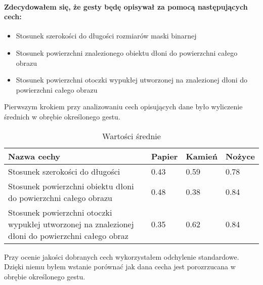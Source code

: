 \documentclass[a4paper,12pt,twoside,openany]{report}
\begin{document}
\paragraph{Zdecydowałem się, że gesty będę opisywał za pomocą następujących cech:}
\begin{itemize}
	\item Stosunek szerokości do długości rozmiarów maski binarnej
	\item Stosunek powierzchni znalezionego obiektu dłoni do powierzchni całego obrazu
	\item Stosunek powierzchni otoczki wypukłej utworzonej na znalezionej dłoni do powierzchni całego obrazu
\end{itemize}

Pierwszym krokiem przy analizowaniu cech opisujących dane było wyliczenie średnich w obrębie określonego gestu.

\begin{table}[H]
	\centering
	\begin{tabularx}{\textwidth}{|X|l|l|l|}
		\hline
		\textbf{Nazwa cechy} & \textbf{Papier} & \textbf{Kamień} & \textbf{Nożyce} \\ 
		
		\hline
		Stosunek szerokości do długości & 0.43 & 0.59 & 0.78 \\ 
		
		\hline
		Stosunek powierzchni obiektu dłoni do powierzchni całego obrazu & 0.48 & 0.38 & 0.84 \\ 
		
		\hline
		Stosunek powierzchni otoczki wypukłej utworzonej na znalezionej dłoni do powierzchni całego obraz & 0.35 & 0.62 & 0.84 \\ 
		\hline
	\end{tabularx}

	\caption{Wartości średnie}
\end{table}

Przy ocenie jakości dobranych cech wykorzystałem odchylenie standardowe. Dzięki niemu byłem wstanie porównać jak dana cecha jest porozrzucana w obrębie określonego gestu.
\end{document}
